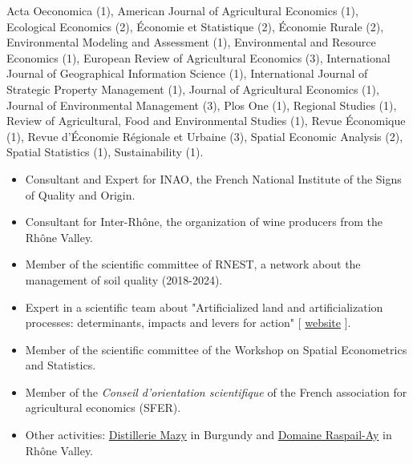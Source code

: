 \documentclass[11pt, a4paper]{./style}
\begin{document}
\label{sec:orgdadebd8}

\vspace{.5cm}

Acta Oeconomica (1), American Journal of Agricultural Economics
(1), Ecological Economics (2), Économie et Statistique (2),
Économie Rurale (2), Environmental Modeling and Assessment (1),
Environmental and Resource Economics (1), European Review of
Agricultural Economics (3), International Journal of Geographical
Information Science (1), International Journal of Strategic
Property Management (1), Journal of Agricultural Economics (1),
Journal of Environmental Management (3), Plos One (1), Regional
Studies (1), Review of Agricultural, Food and Environmental Studies
(1), Revue Économique (1), Revue d'Économie Régionale et Urbaine
(3), Spatial Economic Analysis (2), Spatial Statistics (1),
Sustainability (1).

\vspace{.5cm}

\label{sec:org552099a}

\begin{itemize}
\item Consultant and Expert for INAO, the French National Institute of
the Signs of Quality and Origin.
\item Consultant for Inter-Rhône, the organization of wine producers
from the Rhône Valley.
\item Member of the scientific committee of RNEST, a network about the
management of soil quality (2018-2024).
\item Expert in a scientific team about "Artificialized land and
artificialization processes: determinants, impacts and levers for
action" [ \href{https://www.inrae.fr/actualites/sols-artificialises-processus-dartificialisation-sols}{website} ].
\item Member of the scientific committee of the Workshop on Spatial
Econometrics and Statistics.
\item Member of the \emph{Conseil d'orientation scientifique} of the French
association for agricultural economics (SFER).
\item Other activities: \href{https://distillerie-mazy.fr/}{Distillerie Mazy} in Burgundy and \href{https://www.gigondas-vin.com/vigneron/domaine-raspail-ay/}{Domaine
Raspail-Ay} in Rhône Valley.
\end{itemize}
\end{document}
